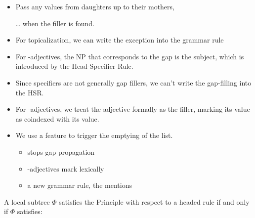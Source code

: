 \documentclass[a4paper,landscape,headrule,footrule]{foils}
\begin{document}
\MyLogo{}
\begin{itemize}
\item Pass any  values from daughters up to their
mothers,
\item[\ldots]  when the filler is found.
\item For topicalization, we can write the exception into
the grammar rule
\item For -adjectives, the NP that corresponds to the
gap is the subject, which is introduced by the
Head-Specifier Rule.
\item Since specifiers are not generally gap fillers, we
can't write the gap-filling into the HSR.
\end{itemize}

\begin{itemize}
\item For -adjectives, we treat the adjective formally
as the filler, marking its  value as coindexed
with its  value.
\item We use a feature  to trigger the
  emptying of the  list.
  \begin{itemize}
  \item {} stops gap propagation
  \item {}-adjectives mark  lexically
  \item a new grammar rule, the 
    mentions 
  \end{itemize}
\end{itemize}

A local subtree $\Phi$ satisfies the  Principle with respect to a
headed rule  if and only if $\Phi$ satisfies:


\end{document}
